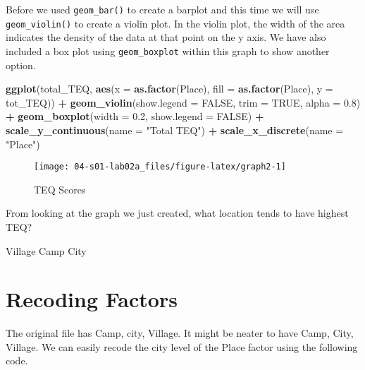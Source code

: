 \documentclass[]{book}
\newenvironment{Shaded}{\begin{snugshade}}{\end{snugshade}}
\newcommand{\DataTypeTok}[1]{\textcolor[rgb]{0.13,0.29,0.53}{#1}}
\newcommand{\FloatTok}[1]{\textcolor[rgb]{0.00,0.00,0.81}{#1}}
\newcommand{\KeywordTok}[1]{\textcolor[rgb]{0.13,0.29,0.53}{\textbf{#1}}}
\newcommand{\NormalTok}[1]{#1}
\newcommand{\OperatorTok}[1]{\textcolor[rgb]{0.81,0.36,0.00}{\textbf{#1}}}
\newcommand{\OtherTok}[1]{\textcolor[rgb]{0.56,0.35,0.01}{#1}}
\newcommand{\StringTok}[1]{\textcolor[rgb]{0.31,0.60,0.02}{#1}}
\begin{document}
Before we used \texttt{geom\_bar()} to create a barplot and this time we will use \texttt{geom\_violin()} to create a violin plot. In the violin plot, the width of the area indicates the density of the data at that point on the y axis. We have also included a box plot using \texttt{geom\_boxplot} within this graph to show another option.

\begin{Shaded}
\begin{Highlighting}[]
\KeywordTok{ggplot}\NormalTok{(total_TEQ, }\KeywordTok{aes}\NormalTok{(}\DataTypeTok{x =} \KeywordTok{as.factor}\NormalTok{(Place), }\DataTypeTok{fill =} \KeywordTok{as.factor}\NormalTok{(Place), }\DataTypeTok{y =}\NormalTok{ tot_TEQ)) }\OperatorTok{+}\StringTok{ }\KeywordTok{geom_violin}\NormalTok{(}\DataTypeTok{show.legend =} \OtherTok{FALSE}\NormalTok{, }\DataTypeTok{trim =} \OtherTok{TRUE}\NormalTok{, }\DataTypeTok{alpha =} \FloatTok{0.8}\NormalTok{) }\OperatorTok{+}
\StringTok{  }\KeywordTok{geom_boxplot}\NormalTok{(}\DataTypeTok{width =} \FloatTok{0.2}\NormalTok{, }\DataTypeTok{show.legend =} \OtherTok{FALSE}\NormalTok{) }\OperatorTok{+}
\StringTok{  }\KeywordTok{scale_y_continuous}\NormalTok{(}\DataTypeTok{name =} \StringTok{"Total TEQ"}\NormalTok{) }\OperatorTok{+}
\StringTok{  }\KeywordTok{scale_x_discrete}\NormalTok{(}\DataTypeTok{name =} \StringTok{"Place"}\NormalTok{)}
\end{Highlighting}
\end{Shaded}

\begin{figure}

{\centering \texttt{[image: 04-s01-lab02a\_files/figure-latex/graph2-1]} 

}

\caption{TEQ Scores}\label{fig:graph2}
\end{figure}

From looking at the graph we just created, what location tends to have highest TEQ?

 Village Camp City

\hypertarget{recoding-factors}{%
\section{Recoding Factors}\label{recoding-factors}}

The original file has Camp, city, Village. It might be neater to have Camp, City, Village. We can easily recode the city level of the Place factor using the following code.
\end{document}
